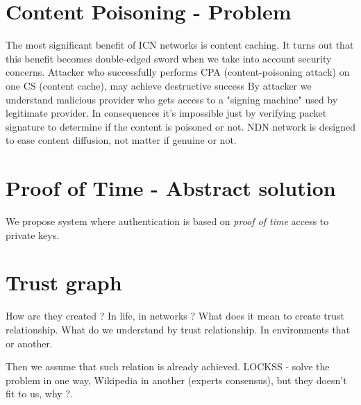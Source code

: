 \documentclass[runningheads]{llncs}
\begin{document}
\section{Content Poisoning - Problem}
The most significant benefit of ICN networks is content caching. It turns out that this benefit becomes double-edged sword when we take into account security concerns. Attacker who successfully performs CPA (content-poisoning attack) on one CS (content cache), may achieve destructive success 
By attacker we understand malicious provider who gets access to a "signing machine" used by legitimate provider. In consequences it's impossible just by verifying packet signature to determine if the content is poisoned or not. NDN network is designed to ease content diffusion, not matter if genuine or not.

\section{Proof of Time - Abstract solution}
We propose system where authentication is based on \textit{proof of time} access to private keys. 

\section{Trust graph}
How are they created ? In life, in networks ? What does it mean to create trust relationship. What do we understand by trust relationship. In environments that or another. 

Then we assume that such relation is already achieved. 
LOCKSS - solve the problem in one way, Wikipedia in another (experts consensus), but they doesn't fit to us, why ?. 
\end{document}
